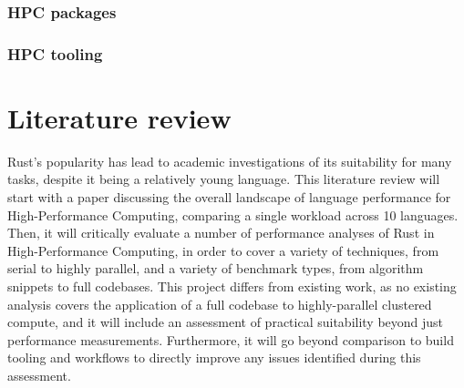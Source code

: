 \subsubsection{HPC packages}
\label{sssec:hpc-packages}

\subsubsection{HPC tooling}
\label{sssec:hpc-tooling}



\section{Literature review} %
\label{sec:literature-review}

Rust's popularity has lead to academic investigations of its suitability for many tasks, despite it being a relatively young language. This literature review will start with a paper discussing the overall landscape of language performance for High-Performance Computing, comparing a single workload across 10 languages. Then, it will critically evaluate a number of performance analyses of Rust in High-Performance Computing, in order to cover a variety of techniques, from serial to highly parallel, and a variety of benchmark types, from algorithm snippets to full codebases. This project differs from existing work, as no existing analysis covers the application of a full codebase to highly-parallel clustered compute, and it will include an assessment of practical suitability beyond just performance measurements. Furthermore, it will go beyond comparison to build tooling and workflows to directly improve any issues identified during this assessment.

